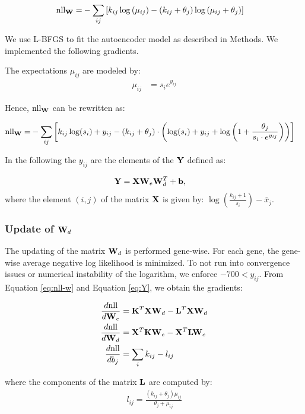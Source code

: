\begin{align} \label{eq:nll-w}
\text{nll}_{\mathbf{W}} =& -\sum_{ij} \left[ k_{ij} \log{(\mu_{ij})} - (k_{ij} + \theta_j) \log{(\mu_{ij} + \theta_j)} \right]
\end{align}


We use L-BFGS to fit the autoencoder model as described in Methods.
We implemented the following gradients.

The expectations $\mu_{ij}$ are modeled by:
\begin{align*}
\mu_{ij} &= s_ie^{y_{ij}}
\end{align*}

Hence,  $\text{nll}_{\mathbf{W}}$ can be rewritten as:

\begin{align*}
\text{nll}_{\mathbf{W}} =&  
- \sum_{ij} \left[ k_{ij} \log(s_i) + y_{ij} - (k_{ij} + \theta_j) \cdot \left( \log(s_i) + y_{ij} + \log\left(1 + \frac{\theta_j}{s_i \cdot e^{y_{ij}}}\right) \right) \right]
\end{align*}

In the following the $y_{ij}$ are the elements of the $\mathbf{Y}$ defined as:

\begin{align}\label{eq:Y}
\mathbf{Y} &= \mathbf{X} \mathbf{W}_e \mathbf{W}_d^T + \mathbf{b},
\end{align}
where the element $(i,j)$ of the matrix $\mathbf{X}$ is given by: 
$\log{\left(\frac{k_{ij}+1}{s_i}\right)} - \bar{x}_j$. 

\subsubsection*{Update of $\mathbf{W}_d$}

The updating of the matrix $\mathbf{W}_d$ is performed gene-wise. 
For each gene, the gene-wise average negative log likelihood is minimized. 
To not run into convergence issues or numerical instability of the logarithm, we enforce $-700 < y_{ij}$.
From Equation \ref{eq:nll-w} and Equation \ref{eq:Y}, we obtain the gradients:

\begin{align*}
    \frac{d\text{nll}}{d\mathbf{W}_e} &= \mathbf{K}^T \mathbf{X} \mathbf{W}_d - \mathbf{L}^T \mathbf{X} \mathbf{W}_d \\  
    \frac{d\text{nll}}{d\mathbf{W}_d} &= \mathbf{X}^T \mathbf{K} \mathbf{W}_e - \mathbf{X}^T \mathbf{L} \mathbf{W}_e \\
    \frac{d\text{nll}}{db_j} &= \sum_{i} k_{ij} - l_{ij}
\end{align*}

where the components of the matrix $\mathbf{L}$ are computed by:
\begin{align*}
    l_{ij} = \frac{(k_{ij} + \theta_j) \mu_{ij}}{\theta_j + \mu_{ij}}   
\end{align*}

